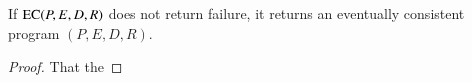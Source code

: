 \begin{theorem}
If $\textsc{EC}(P, E, D, R)$ does not return failure, it returns an eventually consistent program $(P, E, D, R)$.
\end{theorem}
\begin{proof}
That the 
\end{proof}

